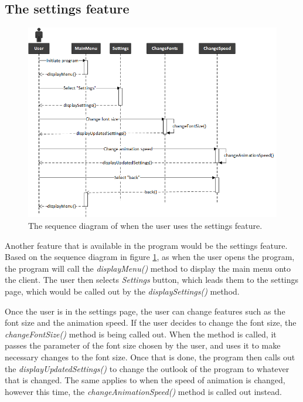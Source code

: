 \newpage

\subsection{The settings feature}

\begin{figure}[H]
\centering
\hspace*{-1cm}
\includegraphics[scale=0.9]{images/report_images/sequenceDiagramSettings.png}
\caption{The sequence diagram of when the user uses the settings feature.}
\label{sequenceDiagramSettings}
\end{figure}

Another feature that is available in the program would be the settings feature. Based on the sequence diagram in figure \ref{sequenceDiagramSettings}, as when the user opens the program, the program will call the \textit{displayMenu()} method to display the main menu onto the client. The user then selects \textit{Settings} button, which leads them to the settings page, which would be called out by the \textit{displaySettings()} method.

Once the user is in the settings page, the user can change features such as the font size and the animation speed. If the user decides to change the font size, the \textit{changeFontSize()} method is being called out. When the method is called, it passes the parameter of the font size chosen by the user, and uses it to make necessary changes to the font size. Once that is done, the program then calls out the \textit{displayUpdatedSettings()} to change the outlook of the program to whatever that is changed. The same applies to when the speed of animation is changed, however this time, the \textit{changeAnimationSpeed()} method is called out instead. 

